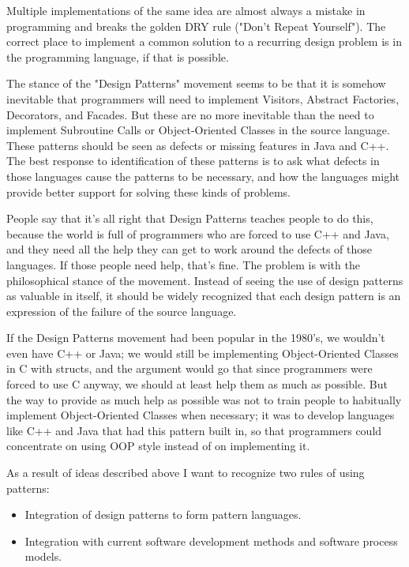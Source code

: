 Multiple implementations of the same idea are almost always a mistake in programming and breaks the golden DRY rule ("Don't Repeat Yourself"). The correct place to implement a common solution to a recurring design problem is in the programming language, if that is possible.

The stance of the "Design Patterns" movement seems to be that it is somehow inevitable that programmers will need to implement Visitors, Abstract Factories, Decorators, and Facades. But these are no more inevitable than the need to implement Subroutine Calls or Object-Oriented Classes in the source language. These patterns should be seen as defects or missing features in Java and C++. The best response to identification of these patterns is to ask what defects in those languages cause the patterns to be necessary, and how the languages might provide better support for solving these kinds of problems.

People say that it's all right that Design Patterns teaches people to do this, because the world is full of programmers who are forced to use C++ and Java, and they need all the help they can get to work around the defects of those languages. If those people need help, that's fine. The problem is with the philosophical stance of the movement. Instead of seeing the use of design patterns as valuable in itself, it should be widely recognized that each design pattern is an expression of the failure of the source language.

If the Design Patterns movement had been popular in the 1980's, we wouldn't even have C++ or Java; we would still be implementing Object-Oriented Classes in C with structs, and the argument would go that since programmers were forced to use C anyway, we should at least help them as much as possible. But the way to provide as much help as possible was not to train people to habitually implement Object-Oriented Classes when necessary; it was to develop languages like C++ and Java that had this pattern built in, so that programmers could concentrate on using OOP style instead of on implementing it.

As a result of ideas described above I want to recognize two rules of using patterns:

\begin{itemize}
	\item Integration of design patterns to form pattern languages.
	\item Integration with current software development methods and software process models.
\end{itemize}

